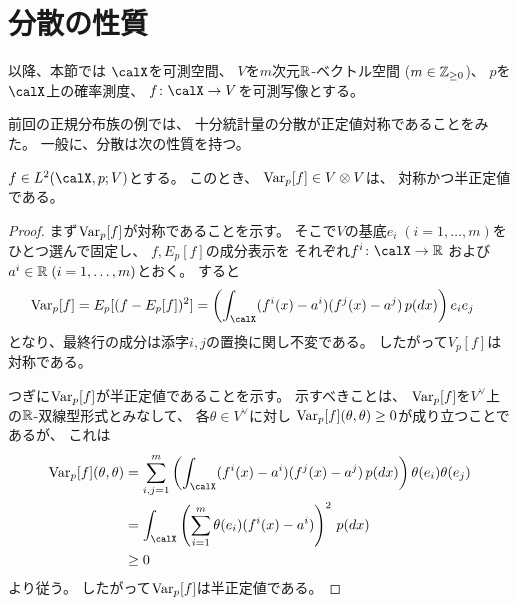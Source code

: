 \documentclass[report]{jlreq}
\begin{document}
%
\section{分散の性質}

以降、本節では
$\calX$を可測空間、
$V$を$m$次元$\mathbb{R}$-ベクトル空間 ($m \in \mathbb{Z}_{\ge 0}$)、
$p$を$\calX$上の確率測度、
$f \colon \calX \to V$を可測写像とする。

前回の正規分布族の例では、
十分統計量の分散が正定値対称であることをみた。
一般に、分散は次の性質を持つ。

\begin{theorem}[分散の半正定値対称性]
    $f \in L^2(\calX, p; V)$とする。
    このとき、
    $\operatorname{Var}_p[f] \in V \otimes V$は、
    対称かつ半正定値である。
\end{theorem}

\begin{proof}
    まず$\operatorname{Var}_p[f]$が対称であることを示す。
    そこで$V$の基底$e_i \; (i = 1, \dots, m)$をひとつ選んで固定し、
    $f, E_p[f]$の成分表示を
    それぞれ$f^i \colon \calX \to \R$
    および
    $a^i \in \mathbb{R} \; (i = 1, \dots, m)$とおく。
    すると
    \begin{alignat}{1}
        \Var_p[f]
            &= E_p[(f - E_p[f])^2]
            = \myparen{
                \int_\calX
                (f^i(x) - a^i)(f^j(x) - a^j)
                \, p(dx)
            } e_i e_j
    \end{alignat}
    となり、最終行の成分は添字$i, j$の置換に関し不変である。
    したがって$V_p[f]$は対称である。

    つぎに$\operatorname{Var}_p[f]$が半正定値であることを示す。
    示すべきことは、
    $\operatorname{Var}_p[f]$を$V^\vee$上の$\mathbb{R}$-双線型形式とみなして、
    各$\theta \in V^\vee$に対し
    $\operatorname{Var}_p[f](\theta, \theta) \ge 0$が成り立つことであるが、
    これは
    \begin{alignat}{1}
        \Var_p[f](\theta, \theta)
            &= \sum_{i, j = 1}^m
                \myparen{
                    \int_\calX (f^i(x) - a^i)(f^j(x) - a^j) \, p(dx)
                }
                \theta(e_i) \theta(e_j) \\
            &= \int_\calX \myparen{
                \sum_{i = 1}^m
                \theta(e_i)(f^i(x) - a^i)
            }^2 \, p(dx) \\
            &\ge 0
    \end{alignat}
    より従う。
    したがって$\operatorname{Var}_p[f]$は半正定値である。
\end{proof}
\end{document}
